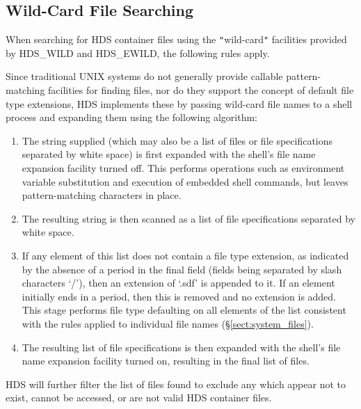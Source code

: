 \documentclass[11pt]{article}
\newcommand{\htmlref}[2]{#1}
\newcommand{\xlabel}[1]{}
\newcommand{\qt}[1]{``#1''}
\renewcommand{\qt}[1]{{\tt{"}}#1{\tt{"}}}
\begin{document}
\subsection{\xlabel{wild_card_file_searching}\label{sect:system_wild}Wild-Card File Searching}

When searching for HDS container files using the \qt{wild-card}
facilities provided by \htmlref{HDS\_WILD}{HDS_WILD} and
\htmlref{HDS\_EWILD}{HDS_EWILD}, the following rules apply.

Since traditional UNIX systems do not generally provide callable
pattern-matching facilities for finding files, nor do they support the
concept of default file type extensions, HDS implements these by
passing wild-card file names to a shell process and expanding them
using the following algorithm:

\begin{enumerate}

\item
The string supplied (which may also be a list of files or file
specifications separated by white space) is first expanded with the
shell's file name expansion facility turned off. This performs
operations such as environment variable substitution and execution of
embedded shell commands, but leaves pattern-matching characters in
place.

\item
The resulting string is then scanned as a list of file specifications
separated by white space.

\item
If any element of this list does not contain a file type extension, as
indicated by the absence of a period in the final field (fields being
separated by slash characters `/'), then an extension of `.sdf' is
appended to it. If an element initially ends in a period, then this is
removed and no extension is added. This stage performs file type
defaulting on all elements of the list consistent with the rules
applied to individual file names (\S\ref{sect:system_files}).

\item
The resulting list of file specifications is then expanded with the
shell's file name expansion facility turned on, resulting in the final
list of files.

\end{enumerate}

HDS will further filter the list of files found to exclude any which
appear not to exist, cannot be accessed, or are not valid HDS
container files.
\end{document}
